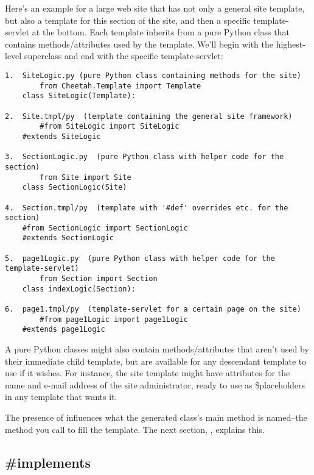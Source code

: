 Here's an example for a large web site that has not only a general site
template, but also a template for this section of the site, and then a
specific template-servlet at the bottom.  Each template inherits from a
pure Python class that contains methods/attributes used by the template.
We'll begin with the highest-level superclass and end with the specific
template-servlet:

\begin{verbatim}
1.  SiteLogic.py (pure Python class containing methods for the site)
        from Cheetah.Template import Template
	class SiteLogic(Template):

2.  Site.tmpl/py  (template containing the general site framework)
        #from SiteLogic import SiteLogic
	#extends SiteLogic

3.  SectionLogic.py  (pure Python class with helper code for the section)
        from Site import Site
	class SectionLogic(Site)

4.  Section.tmpl/py  (template with '#def' overrides etc. for the section)
	#from SectionLogic import SectionLogic
	#extends SectionLogic

5.  page1Logic.py  (pure Python class with helper code for the template-servlet)
        from Section import Section
	class indexLogic(Section):

6.  page1.tmpl/py  (template-servlet for a certain page on the site)
        #from page1Logic import page1Logic
	#extends page1Logic
\end{verbatim}

A pure Python classes might also contain methods/attributes that aren't used by
their immediate child template, but are available for any descendant
template to use if it wishes.  For instance, the site template might have
attributes for the name and e-mail address of the site administrator, 
ready to use as \$placeholders in any template that wants it.

The presence of  influences what the generated class's main
method is named--the method you call to fill the template.  The next section,
, explains this.


\subsection{\#implements}
\label{inheritanceEtc.implements}

